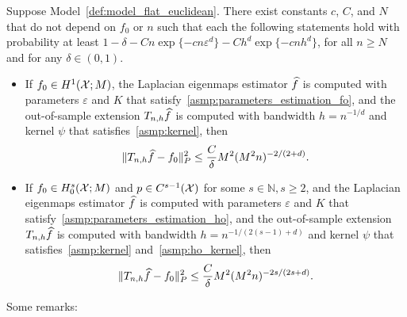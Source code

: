 \begin{theorem}
	\label{thm:laplacian_eigenmaps_estimation_out_of_sample}
	Suppose Model~\ref{def:model_flat_euclidean}. There exist constants $c$, $C$, and $N$ that do not depend on $f_0$ or $n$ such that each the following statements hold with probability at least $1 - \delta - Cn\exp\{-cn\varepsilon^d\} - Ch^d\exp\{-cnh^d\}$,  for all $n \geq N$ and for any $\delta \in (0,1)$.
	\begin{itemize}
		\item If $f_0 \in H^1(\mathcal{X};M)$, the Laplacian eigenmaps estimator $\widehat{f}$ is computed with parameters $\varepsilon$ and $K$ that satisfy~\ref{asmp:parameters_estimation_fo}, and the out-of-sample extension $T_{n,h}\widehat{f}$ is computed with bandwidth $h = n^{-1/d}$ and kernel $\psi$ that satisfies~\ref{asmp:kernel}, then
		\begin{equation*}
		\|T_{n,h}\widehat{f} - f_0\|_P^2 \leq \frac{C}{\delta}M^2(M^2n)^{-2/(2 + d)}.
		\end{equation*}
		\item If $f_0 \in H_0^s(\mathcal{X};M)$ and $p \in C^{s - 1}(\mathcal{X})$ for some $s \in \mathbb{N}, s \geq 2$, and the Laplacian eigenmaps estimator $\widehat{f}$ is computed with parameters $\varepsilon$ and $K$ that satisfy~\ref{asmp:parameters_estimation_ho}, and the out-of-sample extension $T_{n,h}\widehat{f}$ is computed with bandwidth $h = n^{-1/(2(s - 1) + d)}$ and kernel $\psi$ that satisfies~\ref{asmp:kernel} and~\ref{asmp:ho_kernel}, then
		\begin{equation*}
		\|T_{n,h}\widehat{f} - f_0\|_P^2 \leq \frac{C}{\delta}M^2(M^2n)^{-2s/(2s + d)}.
		\end{equation*}
	\end{itemize}
\end{theorem}
Some remarks:
